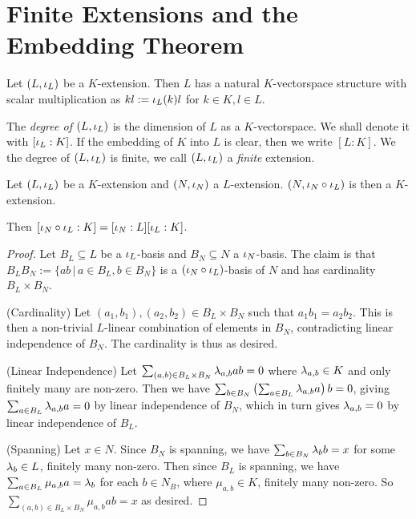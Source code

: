 \documentclass[main.tex]{subfiles}
\begin{document}
\section{Finite Extensions and the Embedding Theorem}

\begin{dfn}  
  
  Let $(L,\iota_L)$ be a $K$-extension. 
  Then $L$ has a natural $K$-vectorspace structure with
  scalar multiplication as $k l := \iota_L(k) l$ for $k \in K, l \in L$. 

  The \emph{degree of $(L,\iota_L)$} is the dimension of $L$ as a $K$-vectorspace.
  We shall denote it with $[\iota_L : K]$. 
  If the embedding of $K$ into $L$ is clear, then we write $[L : K]$. 
  We the degree of $(L,\iota_L)$ is finite, 
  we call $(L,\iota_L)$ a \emph{finite} extension. 

\end{dfn}

\begin{thm} 
  
  Let $(L,\iota_L)$ be a $K$-extension and $(N,\iota_N)$ a $L$-extension. 
  $(N,\iota_N \circ \iota_L)$ is then a $K$-extension. 

  Then $[\iota_N \circ \iota_L : K] = [\iota_N : L] [\iota_L : K]$. 
\end{thm} 
\begin{proof}
  Let $B_L \subseteq L$ be a $\iota_L$-basis and 
  $B_N \subseteq N$ a $\iota_N$-basis. 
  The claim is that $B_L B_N := \{ a b \,|\, a \in B_L, b \in B_N\}$
  is a $(\iota_N \circ \iota_L)$-basis of $N$ and has cardinality $B_L \times B_N$.

  (Cardinality) Let $(a_1, b_1), (a_2, b_2) \in B_L \times B_N$
  such that $ a_1 b_1 = a_2 b_2$. 
  This is then a non-trivial $L$-linear combination of elements in $B_N$,
  contradicting linear independence of $B_N$.
  The cardinality is thus as desired. 

  (Linear Independence) 
  Let $\sum_{(a, b) \in B_L \times B_N} \lambda_{a,b} a b = 0$
  where $\lambda_{a,b} \in K$ and only finitely many are non-zero. 
  Then we have 
  $\sum_{b \in B_N} \left(\sum_{a \in B_L} \lambda_{a,b} a\right) b = 0$,
  giving $\sum_{a \in B_L} \lambda_{a,b} a = 0$ by linear independence of $B_N$,
  which in turn gives $\lambda_{a,b} = 0$ by linear independence of $B_L$.
  
  (Spanning) 
  Let $x \in N$. 
  Since $B_N$ is spanning, we have $\sum_{b \in B_N} \lambda_b b = x$ 
  for some $\lambda_b \in L$, finitely many non-zero. 
  Then since $B_L$ is spanning, 
  we have $\sum_{a \in B_L} \mu_{a,b} a = \lambda_b$ for each $b \in N_B$, 
  where $\mu_{a,b} \in K$, finitely many non-zero. 
  So $\sum_{(a,b) \in B_L \times B_N} \mu_{a, b} a b = x$ as desired. 
\end{proof}
\end{document}
